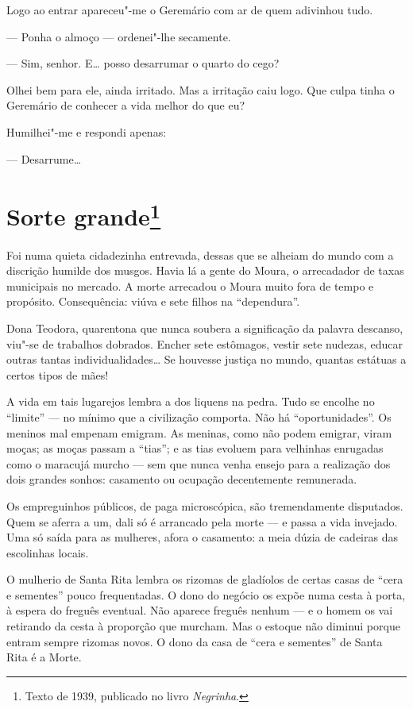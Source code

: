 Logo ao entrar apareceu"-me o Geremário com ar de quem adivinhou tudo.

--- Ponha o almoço --- ordenei"-lhe secamente.

--- Sim, senhor. E\ldots{} posso desarrumar o quarto do cego?

Olhei bem para ele, ainda irritado. Mas a irritação caiu logo. Que culpa
tinha o Geremário de conhecer a vida melhor do que eu?

Humilhei"-me e respondi apenas:

--- Desarrume\ldots{}

\chapter{Sorte grande\footnote[*]{Texto de 1939, publicado no livro \emph{Negrinha}.}}

Foi numa quieta cidadezinha entrevada, dessas que se alheiam do mundo
com a discrição humilde dos musgos. Havia lá a gente do Moura, o
arrecadador de taxas municipais no mercado. A morte arrecadou o Moura
muito fora de tempo e propósito. Consequência: viúva e sete filhos na
``dependura''.

Dona Teodora, quarentona que nunca soubera a significação da palavra
descanso, viu"-se de trabalhos dobrados. Encher sete estômagos, vestir
sete nudezas, educar outras tantas individualidades\ldots{} Se houvesse
justiça no mundo, quantas estátuas a certos tipos de mães!

A vida em tais lugarejos lembra a dos liquens na pedra. Tudo se encolhe
no ``limite'' --- no mínimo que a civilização comporta. Não há
``oportunidades''. Os meninos mal empenam emigram. As meninas, como não
podem emigrar, viram moças; as moças passam a ``tias''; e as tias
evoluem para velhinhas enrugadas como o maracujá murcho --- sem que
nunca venha ensejo para a realização dos dois grandes sonhos: casamento
ou ocupação decentemente remunerada.

Os empreguinhos públicos, de paga microscópica, são tremendamente
disputados. Quem se aferra a um, dali só é arrancado pela morte --- e
passa a vida invejado. Uma só saída para as mulheres, afora o casamento:
a meia dúzia de cadeiras das escolinhas locais.

O mulherio de Santa Rita lembra os rizomas de gladíolos de certas casas
de ``cera e sementes'' pouco frequentadas. O dono do negócio os expõe
numa cesta à porta, à espera do freguês eventual. Não aparece freguês
nenhum --- e o homem os vai retirando da cesta à proporção que murcham.
Mas o estoque não diminui porque entram sempre rizomas novos. O dono da
casa de ``cera e sementes'' de Santa Rita é a Morte.

